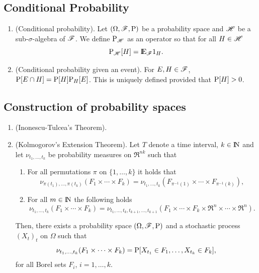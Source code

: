 \documentclass[a4paper,10pt]{scrbook}
\begin{document}
\subsection{Conditional Probability}
\begin{enumerate}
 \item (Conditional probability). Let $(\Omega,\mathscr{F},\mathrm{P})$ be a probability space and $\mathscr{H}$ be a sub-$\sigma$-algebra
       of $\mathscr{F}$. We define $\mathrm{P}_{\mathscr{H}}$ as an operator so that for all $H\in\mathscr{H}$
       \[
        \prob_{\HH}[H] = \E_{\F}1_{H}.
       \]
 \item (Conditional probability given an event). For $E,H\in\mathscr{F}$, $\mathrm{P}[E\cap H] = \mathrm{P}[H]\mathrm{P}_{H}[E]$. This is
       uniquely defined provided that $\mathrm{P}[H]>0$.
\end{enumerate}

\subsection{Construction of probability spaces}
\begin{enumerate}
 \item (Inonescu-Tulcea's Theorem). 
 \item (\hypertarget{link:kolmogorov_extension_thm}{Kolmogorov's Extension Theorem}). Let \(T\) denote a time interval, \(k\in\N\) and let 
       \(\nu_{t_1,\ldots, t_k}\) be probability measures on \(\Re^{nk}\) such that 
       \begin{enumerate}
        \item For all permutations \(\pi\) on \(\{1,\ldots, k\}\) it holds that 
        \[
	      \nu_{\pi(t_1),\ldots, \pi(t_k)}(F_1\times\cdots\times F_k)
	      {}={} 
	      \nu_{t_1,\ldots, t_k}(F_{\pi^{-1}(1)}\times \cdots \times F_{\pi^{-1}(k)}),
	\]
	\item For all \(m\in\N\) the following holds 
	\[
		\nu_{t_1,\ldots, t_k}(F_1\times\cdots\times F_k)
		=
		\nu_{t_1,\ldots, t_k,t_{k+1},\ldots, t_{k+1}}(F_1\times\cdots\times F_k\times \Re^n\times \cdots \times \Re^n).
	\]
       \end{enumerate}
      Then, there exists a probability space \((\Omega,\mathscr{F},\mathrm{P})\) and a stochastic process \((X_t)_t\) on \(\Omega\) such that 
      \[
       \nu_{t_1,\ldots, t_k}(F_1\times\cdots\times F_k) = \mathrm{P}[X_{t_1}\in F_1, \ldots, X_{t_k}\in F_k],
      \]
      for all Borel sets \(F_i\), \(i=1,\ldots, k\).
      

\end{enumerate}
\end{document}
